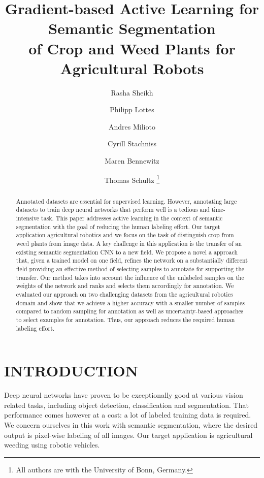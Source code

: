 \documentclass[letterpaper, 10 pt, conference]{ieeeconf}  %
\title{\LARGE \bf Gradient-based Active Learning for Semantic Segmentation\\of Crop and Weed Plants for Agricultural Robots}
\author{Rasha Sheikh \and Philipp Lottes \and Andres Milioto \and Cyrill Stachniss \and Maren Bennewitz \and Thomas Schultz%
  \thanks{All authors are with the University of
    Bonn, Germany.}%
}
\begin{document}
\maketitle
\thispagestyle{empty} 
\pagestyle{empty}


\begin{abstract}
Annotated datasets are essential for supervised learning. However, annotating large datasets to 
train deep neural networks that perform well is a tedious and time-intensive task. This paper 
addresses active learning in the context of semantic segmentation with the goal of reducing the 
human labeling effort. Our target application agricultural robotics and we focus on the task of 
distinguish crop from weed plants from image data. A key challenge in this application is the 
transfer of an existing semantic segmentation CNN to a new field. We propose a novel a approach
that, given a trained model on one field, refines the network on a substantially different field 
providing an effective method of selecting samples to annotate for supporting the transfer. Our 
method takes into account the influence of the unlabeled samples on the weights of the network and 
ranks and selects them accordingly for annotation. We evaluated our approach on two challenging 
datasets from the agricultural robotics domain and show that we achieve a higher accuracy with a 
smaller number of samples compared to random sampling for annotation as well as uncertainty-based 
approaches to select examples for annotation. Thus, our approach reduces the required human labeling 
effort.
\end{abstract} 

\section{INTRODUCTION}
\label{sec:intro}


Deep neural networks have proven to be exceptionally good at various vision related tasks, including object detection, classification and segmentation. That performance comes however at a cost: a lot of labeled training data is required.  We concern ourselves in this work with semantic segmentation, where the desired output is pixel-wise labeling of all images. Our target application is agricultural weeding using robotic vehicles. 
\end{document}
